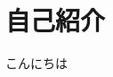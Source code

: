\documentclass[main]{subfiles}
\begin{document}
\section{自己紹介}
\begin{frame}
こんにちは
\end{frame}
\end{document}
